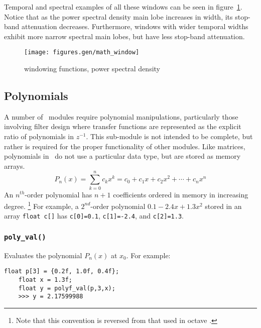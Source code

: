 Temporal and spectral examples of all these windows can be seen in
figure~\ref{fig:module:math:window}.
Notice that as the power spectral density main lobe increases in width, its
stop-band attenuation decreases.
Furthermore, windows with wider temporal widths exhibit more narrow spectral
main lobes, but have less stop-band attenuation.

\begin{figure}
\centering
  \texttt{[image: figures.gen/math\_window]}
\caption{windowing functions, power spectral density}
\label{fig:module:math:window}
\end{figure}

\subsection{Polynomials}
\label{module:math:poly}
A number of \liquid\ modules require polynomial manipulations, particularly
those involving filter design where transfer functions are represented as the
explicit ratio of polynomials in $z^{-1}$.
This sub-module is not intended to be complete, but rather is required for
the proper functionality of other modules.
Like matrices, polynomials in \liquid\ do not use a particular data type, but
are stored as memory arrays.
%
\begin{equation}
\label{eqn:math:poly:representation}
    P_n(x) = \sum_{k=0}^{n}{c_k x^k}
           = c_0 + c_1 x + c_2 x^2 + \cdots + c_n x^n
\end{equation}
%
An $n^{th}$-order polynomial has $n+1$ coefficients ordered in memory in
increasing degree.%
\footnote{Note that this convention is reversed from that used in octave
\cite{octave:web}.}
For example, a $2^{nd}$-order polynomial $0.1 -2.4x + 1.3x^2$ stored in an
array {\tt float c[]} has
{\tt c[0]=0.1},
{\tt c[1]=-2.4}, and
{\tt c[2]=1.3}.

\subsubsection{{\tt poly\_val()}}
\label{module:math:poly:polyf_val}
Evaluates the polynomial $P_n(x)$ at $x_0$.
For example:
\begin{Verbatim}[fontsize=\small]
    float p[3] = {0.2f, 1.0f, 0.4f};
    float x = 1.3f;
    float y = polyf_val(p,3,x);
    >>> y = 2.17599988
\end{Verbatim}

